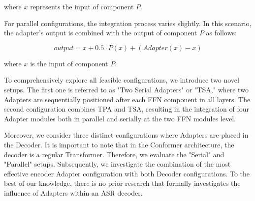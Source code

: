 where $x$ represents the input of component $P$.

For parallel configurations, the integration process varies slightly. In this scenario, the adapter's output is combined with the output of component $P$ as follows:

\begin{equation}
    output = x + 0.5 \cdot P(x) + (Adapter(x) - x)
\end{equation}

where $x$ is the input of component $P$.

To comprehensively explore all feasible configurations, we introduce two novel setups. The first one is referred to as "Two Serial Adapters" or "TSA," where two Adapters are sequentially positioned after each FFN component in all layers. The second configuration combines TPA and TSA, resulting in the integration of four Adapter modules both in parallel and serially at the two FFN modules level. 

Moreover, we consider three distinct configurations where Adapters are placed in the Decoder. It is important to note that in the Conformer architecture, the decoder is a regular Transformer. Therefore, we evaluate the "Serial" and "Parallel" setups. Subsequently, we investigate the combination of the most effective encoder Adapter configuration with both Decoder configurations. To the best of our knowledge, there is no prior research that formally investigates the influence of Adapters within an ASR decoder. 

